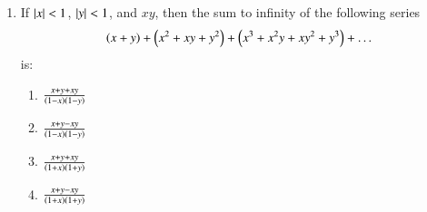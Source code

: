 \documentclass[journal]{IEEEtran}
\begin{document}
\begin{enumerate}
\item If $\left\vert x\right\vert < 1$, $\left\vert y\right\vert < 1$, and $xy$, then the sum to infinity of the following series 
\begin{align*}
    \left(x+y\right) + \left(x^2+xy+y^2\right) + \left(x^3 + x^2y + xy^2 + y^3\right) + \dots
\end{align*}
is:
\begin{multicols}{2}
    \begin{enumerate}
        \item $\frac{x+y+xy}{\left(1-x\right)\left(1-y\right)}$
        \item $\frac{x+y-xy}{\left(1-x\right)\left(1-y\right)}$
        \item $\frac{x+y+xy}{\left(1+x\right)\left(1+y\right)}$
        \item $\frac{x+y-xy}{\left(1+x\right)\left(1+y\right)}$
    \end{enumerate}
\end{multicols}
\end{enumerate}
\end{document}

